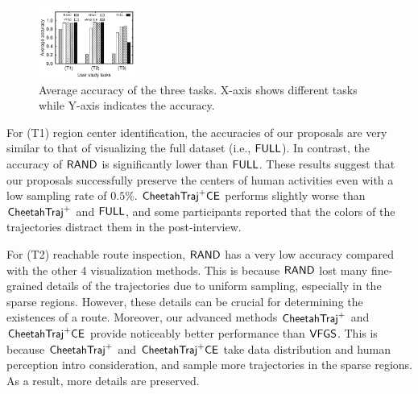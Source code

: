 \begin{figure}[t]
	\centering
	\includegraphics[width=0.3\textwidth]{pictures/userstudy}
	\vspace{-3mm}
	\caption{Average accuracy of the three tasks. X-axis shows different tasks while Y-axis indicates the accuracy.}
	\label{fig:accuracy}
	\vspace{-6mm}
\end{figure}

For (T1) region center identification, the accuracies of our proposals are very similar to that of visualizing the full dataset (i.e., $\mathsf{FULL}$). In contrast, the accuracy of $\mathsf{RAND}{}$ is significantly lower than $\mathsf{FULL}$. These results suggest that our proposals successfully preserve the centers of human activities even with a low sampling rate of $0.5\%$. $\mathsf{CheetahTraj}^{+}\mathsf{CE}$ performs slightly worse than $\mathsf{CheetahTraj}^{+}$ and $\mathsf{FULL}$, and some participants reported that the colors of the trajectories distract them in the post-interview.



For (T2) reachable route inspection, $\mathsf{RAND}$ has a very low accuracy compared with the other 4 visualization methods. This is because $\mathsf{RAND}$ lost many fine-grained details of the trajectories due to uniform sampling, especially in the sparse regions. However, these details can be crucial for determining the existences of a route. Moreover, our advanced methods $\mathsf{CheetahTraj}^{+}$ and $\mathsf{CheetahTraj}^{+}\mathsf{CE}$ provide noticeably better performance than $\mathsf{VFGS}$. This is because $\mathsf{CheetahTraj}^{+}$ and $\mathsf{CheetahTraj}^{+}\mathsf{CE}$ take data distribution and human perception intro consideration, and sample more trajectories in the sparse regions. As a result, more details are preserved.


